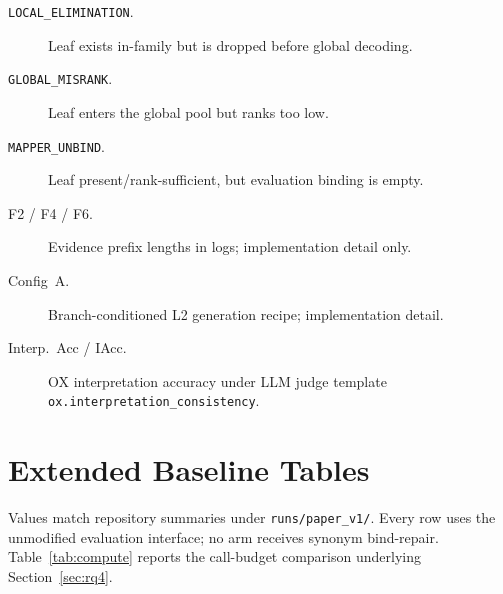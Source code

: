 \begin{description}
  \item[\texttt{LOCAL\_ELIMINATION}.] Leaf exists in-family but is dropped before global decoding.
  \item[\texttt{GLOBAL\_MISRANK}.] Leaf enters the global pool but ranks too low.
  \item[\texttt{MAPPER\_UNBIND}.] Leaf present/rank-sufficient, but evaluation binding is empty.
  \item[F2 / F4 / F6.] Evidence prefix lengths in logs; implementation detail only.
  \item[Config~A.] Branch-conditioned L2 generation recipe; implementation detail.
  \item[Interp.\ Acc / IAcc.] OX interpretation accuracy under LLM judge template \texttt{ox.interpretation\_consistency}.
\end{description}

\section{Extended Baseline Tables}
\label{app:tables}

Values match repository summaries under \texttt{runs/paper\_v1/}.
Every row uses the unmodified evaluation interface; no arm receives synonym bind-repair.
Table~\ref{tab:compute} reports the call-budget comparison underlying Section~\ref{sec:rq4}.

